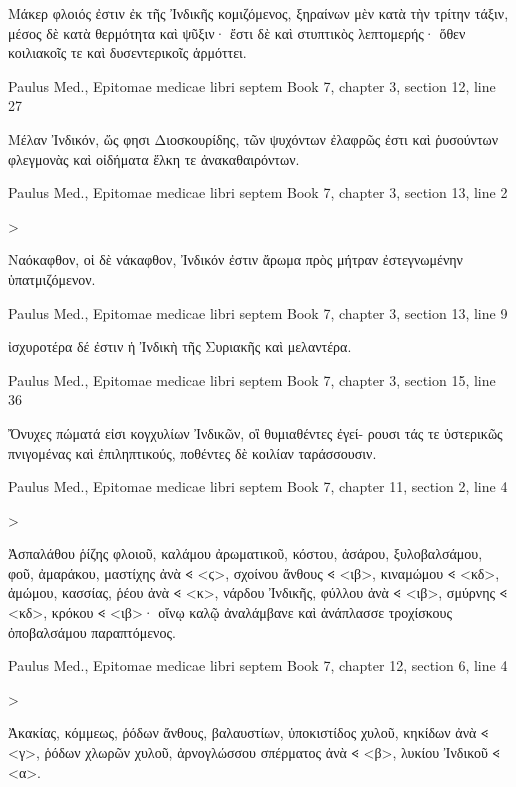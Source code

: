\documentclass[12pt,letterpaper,twoside,final]{memoir}
\begin{document}
\begin{greek}
 Μάκερ φλοιός ἐστιν ἐκ τῆς Ἰνδικῆς κομιζόμενος, ξηραίνων μὲν 
κατὰ τὴν τρίτην τάξιν, μέσος δὲ κατὰ θερμότητα καὶ ψῦξιν· ἔστι 
δὲ καὶ στυπτικὸς λεπτομερής· ὅθεν κοιλιακοῖς τε καὶ δυσεντερικοῖς 
ἁρμόττει. 



Paulus Med., Epitomae medicae libri septem 
Book 7, chapter 3, section 12, line 27

Μέλαν Ἰνδικόν, ὥς φησι Διοσκουρίδης, τῶν ψυχόντων ἐλαφρῶς 
ἐστι καὶ ῥυσούντων φλεγμονὰς καὶ οἰδήματα ἕλκη τε ἀνακαθαιρόντων. 



Paulus Med., Epitomae medicae libri septem 
Book 7, chapter 3, section 13, line 2

                            >


 Ναόκαφθον, οἱ δὲ νάκαφθον, Ἰνδικόν ἐστιν ἄρωμα πρὸς μήτραν 
ἐστεγνωμένην ὑπατμιζόμενον. 



Paulus Med., Epitomae medicae libri septem 
Book 7, chapter 3, section 13, line 9

     ἰσχυροτέρα δέ ἐστιν ἡ Ἰνδικὴ τῆς Συριακῆς καὶ μελαντέρα. 



Paulus Med., Epitomae medicae libri septem 
Book 7, chapter 3, section 15, line 36

Ὄνυχες πώματά εἰσι κογχυλίων Ἰνδικῶν, οἳ θυμιαθέντες ἐγεί-
ρουσι τάς τε ὑστερικῶς πνιγομένας καὶ ἐπιληπτικούς, ποθέντες δὲ 
κοιλίαν ταράσσουσιν. 



Paulus Med., Epitomae medicae libri septem 
Book 7, chapter 11, section 2, line 4

                                                       >


 Ἀσπαλάθου ῥίζης φλοιοῦ, καλάμου ἀρωματικοῦ, κόστου, ἀσάρου, 
ξυλοβαλσάμου, φοῦ, ἀμαράκου, μαστίχης ἀνὰ 𐅻 <ϛ>, σχοίνου ἄνθους 𐅻 <ιβ>, 
κιναμώμου 𐅻 <κδ>, ἀμώμου, κασσίας, ῥέου ἀνὰ 𐅻 <κ>, νάρδου Ἰνδικῆς, 
φύλλου ἀνὰ 𐅻 <ιβ>, σμύρνης 𐅻 <κδ>, κρόκου 𐅻 <ιβ>· οἴνῳ καλῷ ἀναλάμβανε 
καὶ ἀνάπλασσε τροχίσκους ὀποβαλσάμου παραπτόμενος. 



Paulus Med., Epitomae medicae libri septem 
Book 7, chapter 12, section 6, line 4

                         >


 Ἀκακίας, κόμμεως, ῥόδων ἄνθους, βαλαυστίων, ὑποκιστίδος χυλοῦ, 
κηκίδων ἀνὰ 𐅻 <γ>, ῥόδων χλωρῶν χυλοῦ, ἀρνογλώσσου σπέρματος ἀνὰ 
𐅻 <β>, λυκίου Ἰνδικοῦ 𐅻 <α>. 




\end{greek}
\end{document}
